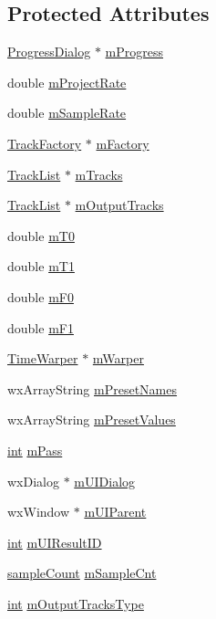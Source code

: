 \subsection*{Protected Attributes}
\begin{DoxyCompactItemize}
\item 
\hyperlink{class_progress_dialog}{Progress\+Dialog} $\ast$ \hyperlink{class_effect_aeb6d0833a07fef3f399dfca890ca76ec}{m\+Progress}
\item 
double \hyperlink{class_effect_a31a15690d58a1414e1aaa52682098f1b}{m\+Project\+Rate}
\item 
double \hyperlink{class_effect_ab1a3d8e761e17f8dbe1a9ad749de4327}{m\+Sample\+Rate}
\item 
\hyperlink{class_track_factory}{Track\+Factory} $\ast$ \hyperlink{class_effect_a5d51a6ae7955c0a31c6b4df5a17a9f07}{m\+Factory}
\item 
\hyperlink{class_track_list}{Track\+List} $\ast$ \hyperlink{class_effect_a5617560453677f895be8d2d7b5d7e19d}{m\+Tracks}
\item 
\hyperlink{class_track_list}{Track\+List} $\ast$ \hyperlink{class_effect_a9fc18f5889f07570bf0f5dff7bb0f625}{m\+Output\+Tracks}
\item 
double \hyperlink{class_effect_ae83563966df5c0b3aba90dd183b15b53}{m\+T0}
\item 
double \hyperlink{class_effect_a7681f0ae7a8245659b002078e78ef146}{m\+T1}
\item 
double \hyperlink{class_effect_a5518bf74e6a990740b161d6c1e7cfe2d}{m\+F0}
\item 
double \hyperlink{class_effect_a195656d6f884aa2b564bb7b6dec392b4}{m\+F1}
\item 
\hyperlink{class_time_warper}{Time\+Warper} $\ast$ \hyperlink{class_effect_ad4f49243ec8c626ba3c5e9044d5fc531}{m\+Warper}
\item 
wx\+Array\+String \hyperlink{class_effect_a0524753a0b166a54fad827989686a57a}{m\+Preset\+Names}
\item 
wx\+Array\+String \hyperlink{class_effect_a2ba4bbc029cb6800d63baccb0036999b}{m\+Preset\+Values}
\item 
\hyperlink{xmltok_8h_a5a0d4a5641ce434f1d23533f2b2e6653}{int} \hyperlink{class_effect_af4b9cffdde5683dc7736eef6501822ee}{m\+Pass}
\item 
wx\+Dialog $\ast$ \hyperlink{class_effect_a2b2400c5b452692ae17279406db85237}{m\+U\+I\+Dialog}
\item 
wx\+Window $\ast$ \hyperlink{class_effect_a72092c469d5f0e82f16fbac57e38229f}{m\+U\+I\+Parent}
\item 
\hyperlink{xmltok_8h_a5a0d4a5641ce434f1d23533f2b2e6653}{int} \hyperlink{class_effect_ac044ccf3a2ad28f9859681d9ec36862f}{m\+U\+I\+Result\+ID}
\item 
\hyperlink{include_2audacity_2_types_8h_afa427e1f521ea5ec12d054e8bd4d0f71}{sample\+Count} \hyperlink{class_effect_adae7f004efce71bcfe0f120f27ec6faf}{m\+Sample\+Cnt}
\item 
\hyperlink{xmltok_8h_a5a0d4a5641ce434f1d23533f2b2e6653}{int} \hyperlink{class_effect_ab4b3ef0361e9f85c2f639bbaec2c2167}{m\+Output\+Tracks\+Type}
\end{DoxyCompactItemize}
